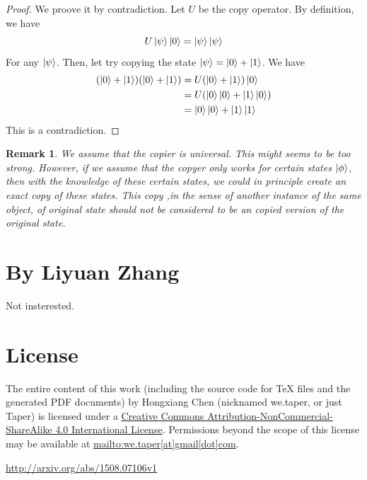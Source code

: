 \documentclass{article}
\numberwithin{equation}{subsection} %
\newtheorem{remark}{Remark}[section]
\theoremstyle{definition}
\begin{document}
\begin{proof}
We proove it by contradiction. Let $U$ be the copy operator. By definition,
we have
$$   U \ket{\psi}\ket{0} = \ket{\psi}\ket{\psi}$$
For any $\ket{\psi}$.
Then, let try copying the state $\ket{\psi} = \ket{0} + \ket{1}$. We have
\begin{align*}
    (\ket{0}+\ket{1})(\ket{0}+\ket{1}) &= U (\ket{0}+\ket{1})\ket{0} \\
    &= U (\ket{0}\ket{0} + \ket{1}\ket{0} ) \\
    &= \ket{0}\ket{0} + \ket{1}\ket{1} \\
\end{align*}
This is a contradiction.
\end{proof}
\begin{remark}
    We assume that the copier is universal. This might seems to be too
    strong. However, if we assume that the copyer only
    works for certain states $\ket{\phi}$, then with the knowledge
    of these certain states, we could in principle create an exact copy
    of these states. This copy ,in the sense of another instance of the
    same object, of original state should not be considered to be an
    copied version of the original state.
\end{remark}

\section{By Liyuan Zhang}
Not insterested.
\section{License}
The entire content of this work (including the source code
for TeX files and the generated PDF documents) by 
Hongxiang Chen (nicknamed we.taper, or just Taper) is
licensed under a 
\href{http://creativecommons.org/licenses/by-nc-sa/4.0/}{Creative 
Commons Attribution-NonCommercial-ShareAlike 4.0 International 
License}. Permissions beyond the scope of this 
license may be available at \url{mailto:we.taper[at]gmail[dot]com}.

\begin{thebibliography}{1}
     \url{http://arxiv.org/abs/1508.07106v1}
\end{thebibliography}
\end{document}
